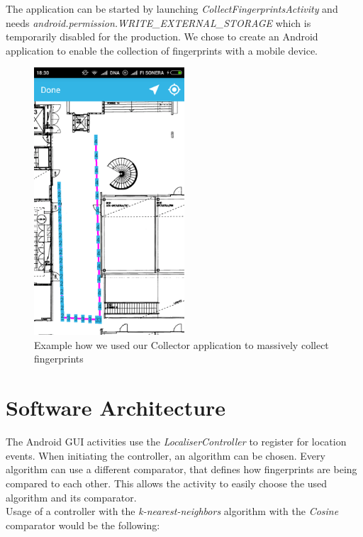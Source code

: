 \documentclass{article}
\begin{document}
The application can be started by launching \textit{CollectFingerprintsActivity} and needs \textit{android.permission.WRITE\_EXTERNAL\_STORAGE} which is temporarily disabled for the production. We chose to create an Android application to enable the collection of fingerprints with a mobile device.

\begin{figure}
    \centering
    \includegraphics[width=0.5\textwidth]{Fingerprints}
    \caption{Example how we used our Collector application to massively collect fingerprints}
    \label{fig:collecting}
\end{figure}


\section{Software Architecture}

The Android GUI activities use the \textit{LocaliserController} to register for location events. When initiating the controller, an algorithm can be chosen. Every algorithm can use a different comparator, that defines how fingerprints are being compared to each other. This allows the activity to easily choose the used algorithm and its comparator.\\

Usage of a controller with the \textit{k-nearest-neighbors} algorithm with the \textit{Cosine} comparator would be the following:
\end{document}
